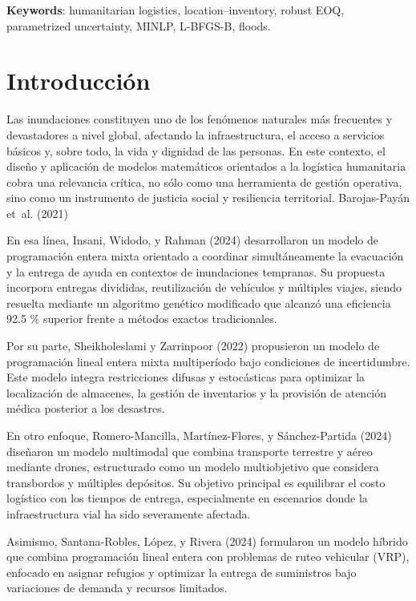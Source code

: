 \documentclass[
  spanish,
  us-letterpaper,
]{scrreprt}
\numberwithin{equation}{section}
\begin{document}
\textbf{Keywords}: humanitarian logistics, location--inventory, robust
EOQ, parametrized uncertainty, MINLP, L-BFGS-B, floods.


\chapter{Introducción}\label{introducciuxf3n}

Las inundaciones constituyen uno de los fenómenos naturales más
frecuentes y devastadores a nivel global, afectando la infraestructura,
el acceso a servicios básicos y, sobre todo, la vida y dignidad de las
personas. En este contexto, el diseño y aplicación de modelos
matemáticos orientados a la logística humanitaria cobra una relevancia
crítica, no sólo como una herramienta de gestión operativa, sino como un
instrumento de justicia social y resiliencia territorial. Barojas-Payán
et~al. (2021)

En esa línea, Insani, Widodo, y Rahman (2024) desarrollaron un modelo de
programación entera mixta orientado a coordinar simultáneamente la
evacuación y la entrega de ayuda en contextos de inundaciones tempranas.
Su propuesta incorpora entregas divididas, reutilización de vehículos y
múltiples viajes, siendo resuelta mediante un algoritmo genético
modificado que alcanzó una eficiencia 92.5 \% superior frente a métodos
exactos tradicionales.

Por su parte, Sheikholeslami y Zarrinpoor (2022) propusieron un modelo
de programación lineal entera mixta multiperíodo bajo condiciones de
incertidumbre. Este modelo integra restricciones difusas y estocásticas
para optimizar la localización de almacenes, la gestión de inventarios y
la provisión de atención médica posterior a los desastres.

En otro enfoque, Romero-Mancilla, Martínez-Flores, y Sánchez-Partida
(2024) diseñaron un modelo multimodal que combina transporte terrestre y
aéreo mediante drones, estructurado como un modelo multiobjetivo que
considera transbordos y múltiples depósitos. Su objetivo principal es
equilibrar el costo logístico con los tiempos de entrega, especialmente
en escenarios donde la infraestructura vial ha sido severamente
afectada.

Asimismo, Santana-Robles, López, y Rivera (2024) formularon un modelo
híbrido que combina programación lineal entera con problemas de ruteo
vehicular (VRP), enfocado en asignar refugios y optimizar la entrega de
suministros bajo variaciones de demanda y recursos limitados.
\end{document}
